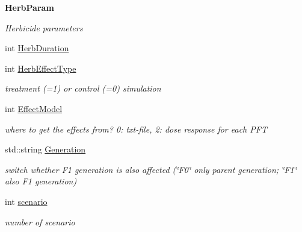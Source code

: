 \begin{Indent}\textbf{ Herb\+Param}\par
{\em Herbicide parameters }\begin{DoxyCompactItemize}
\item 
int \mbox{\hyperlink{struct_s_run_para_aa2c8bf31288f1259299ddbcee53e114c}{Herb\+Duration}}
\item 
\mbox{\label{struct_s_run_para_aab221bcd968825446c9f5b68d419cb2d}} 
int \mbox{\hyperlink{struct_s_run_para_aab221bcd968825446c9f5b68d419cb2d}{Herb\+Effect\+Type}}
\begin{DoxyCompactList}\small\item\em treatment (=1) or control (=0) simulation \end{DoxyCompactList}\item 
\mbox{\label{struct_s_run_para_a4998a2b8af0bb80b191e7b66c23f310e}} 
int \mbox{\hyperlink{struct_s_run_para_a4998a2b8af0bb80b191e7b66c23f310e}{Effect\+Model}}
\begin{DoxyCompactList}\small\item\em where to get the effects from? 0\+: txt-\/file, 2\+: dose response for each P\+FT \end{DoxyCompactList}\item 
\mbox{\label{struct_s_run_para_a1d3de6ce20a7d139d3b08016ff84dd46}} 
std\+::string \mbox{\hyperlink{struct_s_run_para_a1d3de6ce20a7d139d3b08016ff84dd46}{Generation}}
\begin{DoxyCompactList}\small\item\em switch whether F1 generation is also affected (\char`\"{}\+F0\char`\"{} only parent generation; \char`\"{}\+F1\char`\"{} also F1 generation) \end{DoxyCompactList}\item 
\mbox{\label{struct_s_run_para_ae4e8c3cde067719e2149965bebdaf260}} 
int \mbox{\hyperlink{struct_s_run_para_ae4e8c3cde067719e2149965bebdaf260}{scenario}}
\begin{DoxyCompactList}\small\item\em number of scenario \end{DoxyCompactList}\end{DoxyCompactItemize}
\end{Indent}
